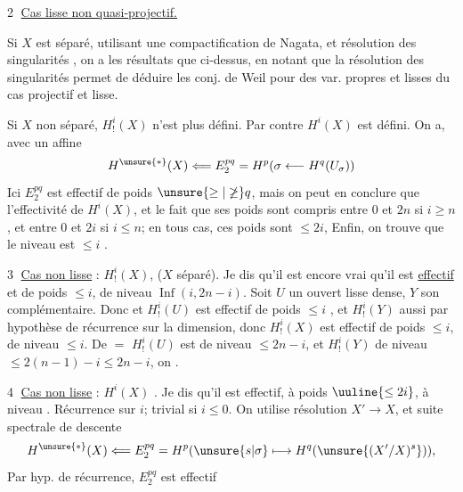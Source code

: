 \textcircled{2} \uline{Cas  lisse non quasi-projectif.}

Si $X$ est séparé, utilisant une compactification de Nagata, et résolution des singularités , on a les  résultats que ci-dessus, en notant que la résolution des singularités permet de déduire les conj. de Weil pour des var. propres et lisses du cas projectif et lisse.

Si $X$ non séparé, $H^i_!(X)$ n'est plus défini. Par contre $H^i(X)$ est défini. On a, avec un  affine
\[
H^{\unsure{*}}(X)\Longleftarrow E^{pq}_2=H^p(\sigma\longleftarrow H^q(U_\sigma))
\]
Ici $E^{pq}_2$ est effectif de poids $\unsure{\ge|\not\ge}q$, mais   on peut en conclure que l'effectivité de $H^i(X)$, et le fait que ses poids sont compris entre $0$ et $2n$ si $i\ge n$, et entre $0$ et $2i$ si $i\le n$; en tous cas, ces poids sont $\le2i$,  Enfin, on trouve que le niveau est $\le i$ .


\textcircled{3} \uline{Cas non lisse} : $H^i_!(X)$, ($X$ séparé). Je dis qu'il est encore vrai qu'il est \uline{effectif} et de poids $\le i$, de niveau $\operatorname{Inf}(i,2n-i)$.
Soit $U$ un ouvert lisse dense, $Y$ son complémentaire.
Donc
et $H^i_!(U)$  est effectif de poids $\le i$ , et $H^i_!(Y)$ aussi par hypothèse de récurrence sur la dimension, donc $H^i_!(X)$ est effectif de poids $\le i$, de niveau $\le i$. De \(=\) $H^i_!(U)$ est de niveau $\le2n-i$, et $H^i_!(Y)$ de niveau $\le2(n-1)-i\le2n-i$, on .

\textcircled{4} \uline{Cas non lisse} : $H^i(X)$ . Je dis qu'il est effectif, à poids $\uuline{\le2i}$, à niveau  .
Récurrence sur $i$; trivial si $i\le0$. On utilise résolution $X'\to X$, et suite spectrale de descente
\[
H^{\unsure{*}}(X)\Longleftarrow E^{pq}_2=H^p(\unsure{s|\sigma}\longmapsto H^q(\unsure{(X'/X)^s})),
\]
  Par hyp. de récurrence,   $E^{pq}_2$ est effectif

